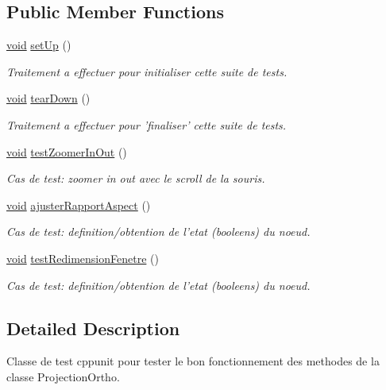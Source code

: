 \subsection*{Public Member Functions}
\begin{DoxyCompactItemize}
\item 
\hyperlink{wglew_8h_aeea6e3dfae3acf232096f57d2d57f084}{void} \hyperlink{group__inf2990_gaf0da04f36972757ddcfc1c09bba812a4}{set\-Up} ()
\begin{DoxyCompactList}\small\item\em Traitement a effectuer pour initialiser cette suite de tests. \end{DoxyCompactList}\item 
\hyperlink{wglew_8h_aeea6e3dfae3acf232096f57d2d57f084}{void} \hyperlink{group__inf2990_gafb91f8be6a3a9addf5909684b4f21cb0}{tear\-Down} ()
\begin{DoxyCompactList}\small\item\em Traitement a effectuer pour 'finaliser' cette suite de tests. \end{DoxyCompactList}\item 
\hyperlink{wglew_8h_aeea6e3dfae3acf232096f57d2d57f084}{void} \hyperlink{group__inf2990_gac39b4634d781adb80ffefcc145dcac80}{test\-Zoomer\-In\-Out} ()
\begin{DoxyCompactList}\small\item\em Cas de test\-: zoomer in out avec le scroll de la souris. \end{DoxyCompactList}\item 
\hyperlink{wglew_8h_aeea6e3dfae3acf232096f57d2d57f084}{void} \hyperlink{group__inf2990_ga8cae25887c7a3d3128a3f7117feb8995}{ajuster\-Rapport\-Aspect} ()
\begin{DoxyCompactList}\small\item\em Cas de test\-: definition/obtention de l'etat (booleens) du noeud. \end{DoxyCompactList}\item 
\hyperlink{wglew_8h_aeea6e3dfae3acf232096f57d2d57f084}{void} \hyperlink{group__inf2990_ga5c9bc480965ea0b477eddd49a7c13511}{test\-Redimension\-Fenetre} ()
\begin{DoxyCompactList}\small\item\em Cas de test\-: definition/obtention de l'etat (booleens) du noeud. \end{DoxyCompactList}\end{DoxyCompactItemize}


\subsection{Detailed Description}
Classe de test cppunit pour tester le bon fonctionnement des methodes de la classe Projection\-Ortho. 


